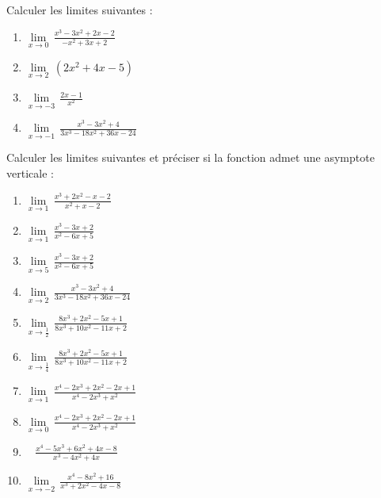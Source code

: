 \begin{exercice}
Calculer les limites suivantes :
\begin{multicols}{2}
\begin{enumerate}
\item $\underset{x\to 0}{\mathop{\lim }}\,\frac{{{x}^{3}}-3{{x}^{2}}+2x-2}{-{{x}^{2}}+3x+2}$
\item $\underset{x\to 2}{\mathop{\lim }}\,\left( 2{{x}^{2}}+4x-5 \right)$
\item $\underset{x\to -3}{\mathop{\lim }}\,\frac{2x-1}{{{x}^{2}}}$
\item $\underset{x\to -1}{\mathop{\lim }}\,\frac{{{x}^{3}}-3{{x}^{2}}+4}{3{{x}^{3}}-18{{x}^{2}}+36x-24}$
\end{enumerate}
\end{multicols}
\end{exercice}

\begin{exercice}
Calculer les limites suivantes et préciser si la fonction admet une asymptote verticale :
\begin{multicols}{2}
\begin{enumerate}
\item $\underset{x\to 1}{\mathop{\lim }}\,\frac{{{x}^{3}}+2{{x}^{2}}-x-2}{{{x}^{2}}+x-2}$
\item $\underset{x\to 1}{\mathop{\lim }}\,\frac{{{x}^{3}}-3x+2}{{{x}^{2}}-6x+5}$
\item $\underset{x\to 5}{\mathop{\lim }}\,\frac{{{x}^{3}}-3x+2}{{{x}^{2}}-6x+5}$
\item $\underset{x\to 2}{\mathop{\lim }}\,\frac{{{x}^{3}}-3{{x}^{2}}+4}{3{{x}^{3}}-18{{x}^{2}}+36x-24}$
\item $\underset{x\to \frac{1}{2}}{\mathop{\lim }}\,\frac{8{{x}^{3}}+2{{x}^{2}}-5x+1}{8{{x}^{3}}+10{{x}^{2}}-11x+2}$
\item $\underset{x\to \frac{1}{4}}{\mathop{\lim }}\,\frac{8{{x}^{3}}+2{{x}^{2}}-5x+1}{8{{x}^{3}}+10{{x}^{2}}-11x+2}$
\item $\underset{x\to 1}{\mathop{\lim }}\,\frac{{{x}^{4}}-2{{x}^{3}}+2{{x}^{2}}-2x+1}{{{x}^{4}}-2{{x}^{3}}+{{x}^{2}}}$
\item $\underset{x\to 0}{\mathop{\lim }}\,\frac{{{x}^{4}}-2{{x}^{3}}+2{{x}^{2}}-2x+1}{{{x}^{4}}-2{{x}^{3}}+{{x}^{2}}}$
\item $\underset{{}}{\mathop{\underset{x\to 0}{\mathop{\lim }}\,}}\,\frac{{{x}^{4}}-5{{x}^{3}}+6{{x}^{2}}+4x-8}{{{x}^{3}}-4{{x}^{2}}+4x}$
\item $\underset{x\to -2}{\mathop{\lim }}\,\frac{{{x}^{4}}-8{{x}^{2}}+16}{{{x}^{3}}+2{{x}^{2}}-4x-8}$
\end{enumerate}
\end{multicols}
\end{exercice}

